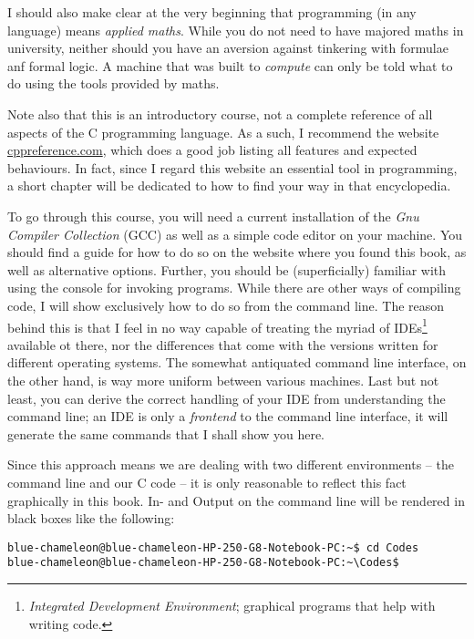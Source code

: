 I should also make clear at the very beginning that programming (in any language) means \emph{applied maths}. While you do not need to have majored maths in university, neither should you have an aversion against tinkering with formulae anf formal logic. A machine that was built to \emph{compute} can only be told what to do using the tools provided by maths.

Note also that this is an introductory course, not a complete reference of all aspects of the C programming language. As a such, I recommend the website \url{cppreference.com}, which does a good job listing all features and expected behaviours. In fact, since I regard this website an essential tool in programming, a short chapter will be dedicated to how to find your way in that encyclopedia.

To go through this course, you will need a current installation of the \emph{Gnu Compiler Collection} (GCC) as well as a simple code editor on your machine. You should find a guide for how to do so on the website where you found this book, as well as alternative options. Further, you should be (superficially) familiar with using the console for invoking programs. While there are other ways of compiling code, I will show exclusively how to do so from the command line. The reason behind this is that I feel in no way capable of treating the myriad of IDEs\footnote{\emph{Integrated Development Environment}; graphical programs that help with writing code.} available ot there, nor the differences that come with the versions written for different operating systems. The somewhat antiquated command line interface, on the other hand, is way more uniform between various machines. Last but not least, you can derive the correct handling of your IDE from understanding the command line; an IDE is only a \emph{frontend} to the command line interface, \ie it will generate the same commands that I shall show you here.

Since this approach means we are dealing with two different environments -- the command line and our C code -- it is only reasonable to reflect this fact graphically in this book. In- and Output on the command line will be rendered in black boxes like the following:
\begin{cmdbox}
\texttt{{\color{green}blue-chameleon@blue-chameleon-HP-250-G8-Notebook-PC}:{\color{blue}\textasciitilde}\$ cd Codes} \\
\texttt{{\color{green}blue-chameleon@blue-chameleon-HP-250-G8-Notebook-PC}:{\color{blue}\textasciitilde\textbackslash Codes}\$}
\end{cmdbox}

